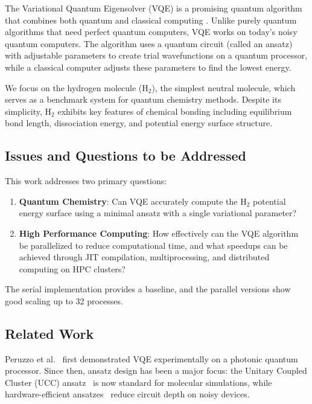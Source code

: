 \documentclass[11pt]{article}
\begin{document}
The Variational Quantum Eigensolver (VQE) is a promising quantum algorithm that combines both quantum and classical computing \cite{peruzzo2014}. Unlike purely quantum algorithms that need perfect quantum computers, VQE works on today's noisy quantum computers. The algorithm uses a quantum circuit (called an ansatz) with adjustable parameters to create trial wavefunctions on a quantum processor, while a classical computer adjusts these parameters to find the lowest energy.

We focus on the hydrogen molecule (H$_2$), the simplest neutral molecule, which serves as a benchmark system for quantum chemistry methods. Despite its simplicity, H$_2$ exhibits key features of chemical bonding including equilibrium bond length, dissociation energy, and potential energy surface structure.

\subsection{Issues and Questions to be Addressed}

This work addresses two primary questions:

\begin{enumerate}
    \item \textbf{Quantum Chemistry}: Can VQE accurately compute the H$_2$ potential energy surface using a minimal ansatz with a single variational parameter?

    \item \textbf{High Performance Computing}: How effectively can the VQE algorithm be parallelized to reduce computational time, and what speedups can be achieved through JIT compilation, multiprocessing, and distributed computing on HPC clusters?
\end{enumerate}

The serial implementation provides a baseline, and the parallel versions show good scaling up to 32 processes.

\subsection{Related Work}

Peruzzo et al.~\cite{peruzzo2014} first demonstrated VQE experimentally on a photonic quantum processor. Since then, ansatz design has been a major focus: the Unitary Coupled Cluster (UCC) ansatz~\cite{romero2018} is now standard for molecular simulations, while hardware-efficient ansatzes~\cite{kandala2017} reduce circuit depth on noisy devices.
\end{document}
